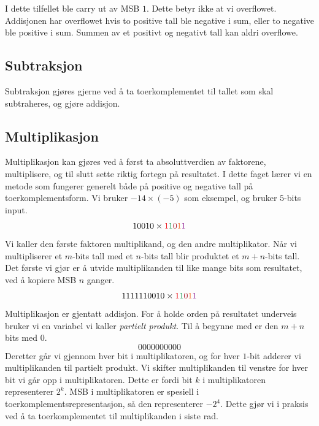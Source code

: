 \documentclass[12pt,a4paper,norsk]{article}
\newcommand{\red}[1]{{\color{Red}#1}}
\newcommand{\green}[1]{{\color{ForestGreen}#1}}
\newcommand{\orange}[1]{{\color{Orange}#1}}
\newcommand{\purple}[1]{{\color{Plum}#1}}
\newcommand{\maroon}[1]{{\color{Maroon}#1}}
\begin{document}
I dette tilfellet ble carry ut av MSB $1$. Dette betyr ikke at vi overflowet.
Addisjonen har overflowet hvis to positive tall ble negative i sum, eller to
negative ble positive i sum. Summen av et positivt og negativt tall kan aldri
overflowe.  

\subsection{Subtraksjon}
Subtraksjon gjøres gjerne ved å ta toerkomplementet til tallet som skal
subtraheres, og gjøre addisjon.

\subsection{Multiplikasjon}
Multiplikasjon kan gjøres ved å først ta absoluttverdien av faktorene,
multiplisere, og til slutt sette riktig fortegn på resultatet. I dette faget
lærer vi en metode som fungerer generelt både på positive og negative tall på
toerkomplementsform. Vi bruker $-14 \times (-5)$ som eksempel, og bruker $5$-bits
input.
\newcommand{\mult}{\red{1}\green{1}\maroon{0}\orange{1}\purple{1}}
%
\[10010 \times \mult\]
%
Vi kaller den første faktoren multiplikand, og den andre multiplikator. Når vi
multipliserer et $m$-bits tall med et $n$-bits tall blir produktet et $m+n$-bits
tall. Det første vi gjør er å utvide multiplikanden til like mange bits som
resultatet, ved å kopiere MSB $n$ ganger.
%
\[1111110010 \times \mult\]
%
Multiplikasjon er gjentatt addisjon. For å holde orden på resultatet underveis
bruker vi en variabel vi kaller \textit{partielt produkt}. Til å begynne med er
den $m+n$ bits med $0$.
\[0000000000\]
Deretter går vi gjennom hver bit i multiplikatoren, og for hver $1$-bit adderer
vi multiplikanden til partielt produkt. Vi skifter multiplikanden til venstre
for hver bit vi går opp i multiplikatoren. Dette er fordi bit $k$ i
multiplikatoren representerer $2^k$. MSB i multiplikatoren er spesiell i
toerkomplementsrepresentasjon, så den representerer $-2^4$. Dette gjør vi i
praksis ved å ta toerkomplementet til multiplikanden i siste rad.
\end{document}

